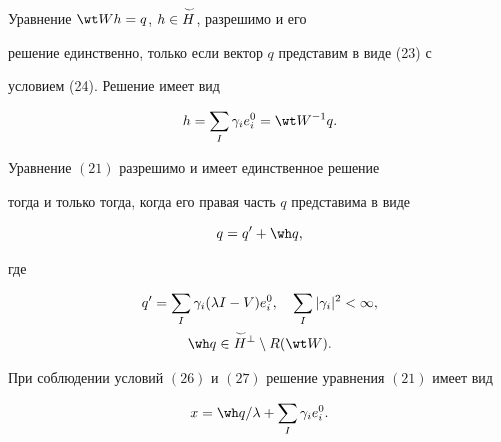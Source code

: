  


\begin{cor} 


Уравнение $\wt W h=q$, $h\in\overset{\,\smile}{H}{}$, разрешимо и его 


решение единственно, только если вектор $q$ представим в виде (23) с 


условием (24). Решение имеет вид 


$$


h=\sum_I \gamma_i e^0_i=\wt W^{-1}q. 


$$


\end{cor} 


 


\begin{thm} 


Уравнение $(21)$ разрешимо и имеет единственное решение 


тогда и только тогда, когда его правая часть $q$ представима в виде 


\begin{equation} 


q=q'+\wh q, 


\end{equation} 


где 


\begin{gather} 


q'=\sum_I \gamma_i(\lambda I-V)e^0_i,\quad 


\sum_I|\gamma_i|^2<\infty, \\ 


\wh q\in\up{\smile}{H}^\bot\setminus R(\wt W). 


\end{gather} 


При соблюдении условий $(26)$ и $(27)$ решение уравнения $(21)$ имеет вид 


\begin{equation} 


x=\wh q/\lambda+\sum_I \gamma_i e^0_i. 


\end{equation} 


\end{thm} 


 


